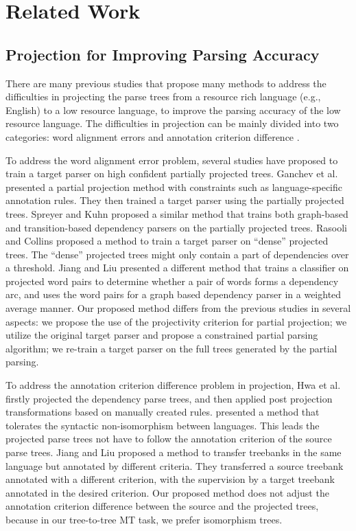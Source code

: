 \documentclass[english]{jnlp_1.4}
\begin{document}
\section{Related Work}

\subsection{Projection for Improving Parsing Accuracy}

There are many previous studies that propose many methods to address the difficulties in projecting the parse 
trees from a resource rich language (e.g., English) to a low resource language, to improve the parsing accuracy 
of the low resource language. The difficulties in projection can be mainly divided into two categories: 
word alignment errors and annotation criterion difference \cite{ganchev-gillenwater-taskar:2009:ACLIJCNLP}.

To address the word alignment error problem, several studies have proposed to train a target parser on high
confident partially projected trees. Ganchev et al. \citeyear{ganchev-gillenwater-taskar:2009:ACLIJCNLP} 
presented a partial projection method with constraints such as language-specific annotation rules.
They then trained a target parser using the partially projected trees. Spreyer and Kuhn \citeyear{spreyer-kuhn:2009:CoNLL} proposed 
a similar method that trains both graph-based and transition-based dependency parsers on the partially projected trees.
Rasooli and Collins \citeyear{rasooli-collins:2015:EMNLP} proposed a method to train a target parser on ``dense'' 
projected trees. The ``dense'' projected trees might only contain a part of dependencies over a threshold.
Jiang and Liu \citeyear{jiang-liu:2010:ACL} presented a different method that trains a classifier on projected 
word pairs to determine whether a pair of words forms a dependency arc, and uses the word pairs for a graph based 
dependency parser in a weighted average manner. Our proposed method differs from the previous studies in 
several aspects: we propose the use of the projectivity criterion for partial projection; we utilize the original 
target parser and propose a constrained partial parsing algorithm; we re-train a target parser on the full trees 
generated by the partial parsing.

To address the annotation criterion difference problem in projection, Hwa et al. \citeyear{hwa2005bootstrapping} 
firstly projected the dependency parse trees, and then applied post projection transformations based on manually
created rules.  presented a method that tolerates the syntactic non-isomorphism 
between languages. This leads the projected parse trees not have to follow the annotation criterion of the source 
parse trees. Jiang and Liu \citeyear{Jiang:2009:AAA:1697236.1697241} proposed a method to transfer treebanks in the
same language but annotated by different criteria. They transferred a source treebank annotated with a different 
criterion, with the supervision by a target treebank annotated in the desired criterion. 
Our proposed method does not adjust the annotation criterion difference between the source and the projected trees, 
because in our tree-to-tree MT task, we prefer isomorphism trees.
\end{document}

